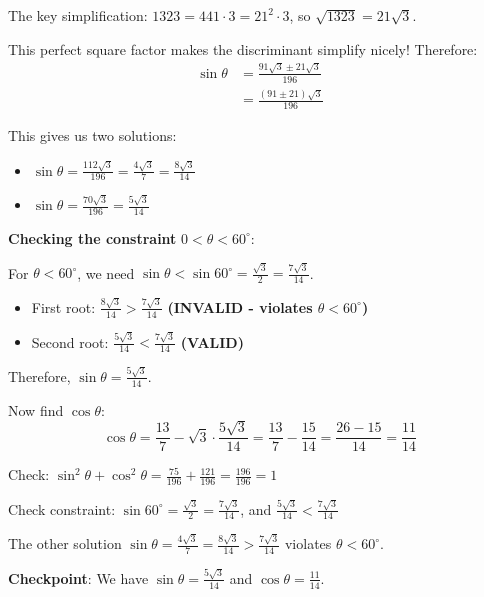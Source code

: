 \documentclass[12pt]{article}
\begin{document}
\begin{solutionbox}
The key simplification: $1323 = 441 \cdot 3 = 21^2 \cdot 3$, so $\sqrt{1323} = 21\sqrt{3}$.

This perfect square factor makes the discriminant simplify nicely! Therefore:
\begin{align*}
    \sin\theta &= \frac{91\sqrt{3} \pm 21\sqrt{3}}{196} \\
    &= \frac{(91 \pm 21)\sqrt{3}}{196}
\end{align*}

This gives us two solutions:
\begin{itemize}
    \item $\sin\theta = \frac{112\sqrt{3}}{196} = \frac{4\sqrt{3}}{7} = \frac{8\sqrt{3}}{14}$
    \item $\sin\theta = \frac{70\sqrt{3}}{196} = \frac{5\sqrt{3}}{14}$
\end{itemize}

\textbf{Checking the constraint} $0 < \theta < 60^{\circ}$:

For $\theta < 60^{\circ}$, we need $\sin\theta < \sin 60^{\circ} = \frac{\sqrt{3}}{2} = \frac{7\sqrt{3}}{14}$.

\begin{itemize}
    \item First root: $\frac{8\sqrt{3}}{14} > \frac{7\sqrt{3}}{14}$ \textbf{(INVALID - violates $\theta < 60^{\circ}$)}
    \item Second root: $\frac{5\sqrt{3}}{14} < \frac{7\sqrt{3}}{14}$ \checkmark \textbf{(VALID)}
\end{itemize}

Therefore, $\sin\theta = \frac{5\sqrt{3}}{14}$.

Now find $\cos\theta$:
$$\cos\theta = \frac{13}{7} - \sqrt{3} \cdot \frac{5\sqrt{3}}{14} = \frac{13}{7} - \frac{15}{14} = \frac{26 - 15}{14} = \frac{11}{14}$$

Check: $\sin^2\theta + \cos^2\theta = \frac{75}{196} + \frac{121}{196} = \frac{196}{196} = 1$ \checkmark

Check constraint: $\sin 60^{\circ} = \frac{\sqrt{3}}{2} = \frac{7\sqrt{3}}{14}$, and $\frac{5\sqrt{3}}{14} < \frac{7\sqrt{3}}{14}$ \checkmark

The other solution $\sin\theta = \frac{4\sqrt{3}}{7} = \frac{8\sqrt{3}}{14} > \frac{7\sqrt{3}}{14}$ violates $\theta < 60^{\circ}$.

\textbf{Checkpoint}: We have $\sin\theta = \frac{5\sqrt{3}}{14}$ and $\cos\theta = \frac{11}{14}$.

\vspace{0.3cm}


\end{solutionbox}
\end{document}
